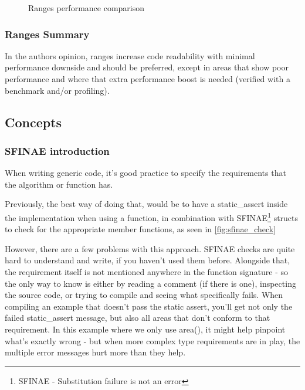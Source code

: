 \documentclass[
    english, %
]{VUMIFPSkursinis}
\begin{document}
\begin{figure}[!htbp]
    \begin{center}
        \scalebox{.9}{
            
        }
    \end{center}
    \caption{Ranges performance comparison}
    \label{fig:ranges_perf}
\end{figure}

\FloatBarrier
\subsubsection{Ranges Summary}

In the authors opinion, ranges increase code readability with minimal performance downside and should be preferred, except in areas
that show poor performance and where that extra performance boost is needed (verified with a benchmark and/or profiling).

\FloatBarrier
\subsection{Concepts}

\FloatBarrier
\subsubsection{SFINAE introduction}
When writing generic code, it's good practice to specify the requirements that the algorithm or function has.

Previously, the best way of doing that, would be to have a static\_assert inside the implementation when using a function, in combination with SFINAE\footnote{SFINAE - Substitution failure is not an error} structs to check for the appropriate member functions, as seen in \cref{fig:sfinae_check}


However, there are a few problems with this approach. SFINAE checks are quite hard to understand and write, if you haven't used them before. Alongside that, the requirement itself is not mentioned anywhere
in the function signature - so the only way to know is either by reading a comment (if there is one), inspecting the source code, or trying to compile and seeing what specifically fails.
When compiling an example that doesn't pass the static assert, you'll get not only the failed static\_assert message, but also all areas that don't conform to that requirement. In this example where we only use
area(), it might help pinpoint what's exactly wrong - but when more complex type requirements are in play, the multiple error messages hurt more than they help.
\end{document}
